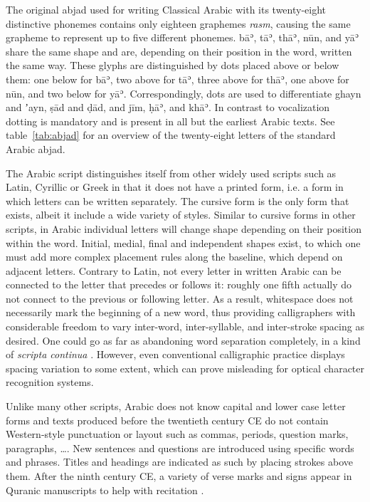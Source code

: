 The original abjad used for writing Classical Arabic with its twenty-eight
distinctive phonemes contains only eighteen graphemes \emph{rasm}, causing the
same grapheme to represent up to five different phonemes. bāʾ, tāʾ, thāʾ, nūn,
and yāʾ share the same shape and are, depending on their position in the word,
written the same way. These glyphs are distinguished by dots placed above or
below them: one below for bāʾ, two above for tāʾ, three above for thāʾ, one
above for nūn, and two below for yāʾ. Correspondingly, dots are used to
differentiate ghayn and ʼayn, ṣād and ḍād, and jīm, ḥāʾ, and khāʾ. In contrast
to vocalization dotting is mandatory and is present in all but the earliest
Arabic texts. See table~\ref{tab:abjad} for an overview of the twenty-eight
letters of the standard Arabic abjad.

The Arabic script distinguishes itself from other widely used scripts such as
Latin, Cyrillic or Greek in that it does not have a printed form, i.e. a form
in which letters can be written separately. The cursive form is the only form
that exists, albeit it include a wide variety of styles. Similar to cursive
forms in other scripts, in Arabic individual letters will change shape
depending on their position within the word. Initial, medial, final and
independent shapes exist, to which one must add more complex placement rules
along the baseline, which depend on adjacent letters. Contrary to Latin, not
every letter in written Arabic can be connected to the letter that precedes or
follows it: roughly one fifth actually do not connect to the previous or following
letter. As a result, whitespace does not necessarily mark the beginning of a
new word, thus providing calligraphers with considerable freedom to vary
inter-word, inter-syllable, and inter-stroke spacing as desired. One could go
as far as abandoning word separation completely, in a kind of \emph{scripta
continua} \cite[pg. 15]{blair2006islamic}. However, even conventional
calligraphic practice displays spacing variation to some extent, which can
prove misleading for optical character recognition systems. 


Unlike many other scripts, Arabic does not know capital and lower case letter
forms and texts produced before the twentieth century CE do not contain
Western-style punctuation or layout such as commas, periods, question marks,
paragraphs, \dots. New sentences and questions are introduced using specific
words and phrases. Titles and headings are indicated as such by placing strokes
above them. After the ninth century CE, a variety of verse marks and signs
appear in Quranic manuscripts to help with recitation \cite{awad2015evolution}.

